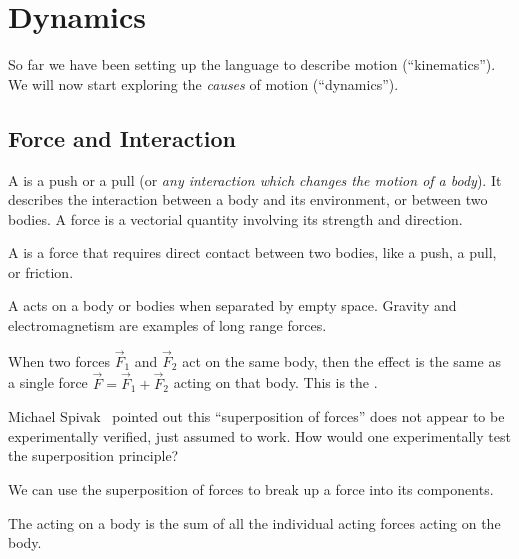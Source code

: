 \section{Dynamics}

\M
So far we have been setting up the language to describe motion
(``kinematics''). We will now start exploring the \emph{causes} of
motion (``dynamics'').

\subsection{Force and Interaction}

\begin{defn}
A  is a push or a pull (or \emph{any
interaction which changes the motion of a body}). It describes the interaction
between a body and its environment, or between two bodies. A force is a
vectorial quantity involving its strength and direction.
\end{defn}

\begin{defn}
A  is a force that requires direct contact between
two bodies, like a push, a pull, or friction.
\end{defn}
\begin{defn}
A  acts on a body or bodies when separated by
empty space. Gravity and electromagnetism are examples of long range forces.
\end{defn}

When two forces $\vec{F}_{1}$ and $\vec{F}_{2}$ act on the same body,
then the effect is the same as a single force
$\vec{F}=\vec{F}_{1}+\vec{F}_{2}$ acting on that body. This is the
.

\begin{rmk}
Michael Spivak~\cite{spivak} pointed out this ``superposition of forces''
does not appear to be experimentally verified, just assumed to work. How
would one experimentally test the superposition principle?
\end{rmk}
\begin{rmk}
We can use the superposition of forces to break up a force into its
components.
\end{rmk}

\begin{defn}
The  acting on a body is the sum of all the individual
acting forces acting on the body.
\end{defn}

